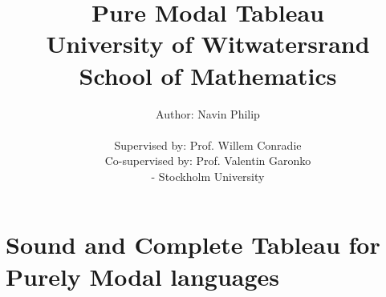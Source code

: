 \documentclass{report}
\title{Pure Modal Tableau\\
\large{University of Witwatersrand}\\School of Mathematics\\}
\author{\Large{Author: Navin Philip} \\ \\
 \Large{Supervised by: Prof. Willem Conradie} \\ 
 \Large{Co-supervised by: Prof. Valentin Garonko}\\ \Large{ - Stockholm University}}
\date{\parbox{\linewidth}{\centering%
  \today\endgraf\bigskip
  A manuscript for publication}}
\theoremstyle{definition}
\begin{document}
\maketitle


\tableofcontents
\newpage



\chapter{Sound and Complete Tableau for Purely Modal languages}\label{sound and complete tableau chapter}







\newpage


\end{document}
